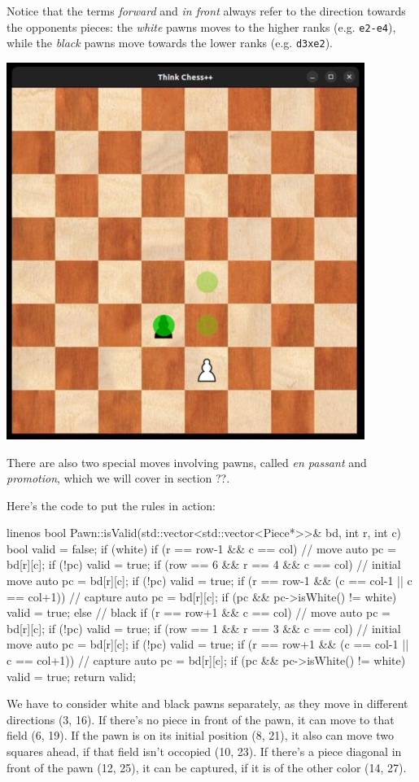Notice that the terms \emph{forward} and \emph{in front} always refer to the direction towards
the opponents pieces: the \emph{white} pawns moves to the higher ranks (e.g. \texttt{e2-e4}),
while the \emph{black} pawns move towards the lower ranks (e.g. \texttt{d3xe2}).

\begin{center}
\includegraphics[width=.5\linewidth]{../img/pawn.jpg}
\end{center}

There are also two special moves involving pawns, called \emph{en passant} and \emph{promotion},
which we will cover in section ??.

Here's the code to put the rules in action:

\begin{cpp*}{linenos}
bool Pawn::isValid(std::vector<std::vector<Piece*>>& bd, int r, int c) {
  bool valid = false;
  if (white) {
    if (r == row-1 && c == col) { // move
      auto pc = bd[r][c];
      if (!pc) valid = true;
    }
    if (row == 6 && r == 4 && c == col) { // initial move
      auto pc = bd[r][c];
      if (!pc) valid = true;
    }
    if (r == row-1 && (c == col-1 || c == col+1)) { // capture
      auto pc = bd[r][c];
      if (pc && pc->isWhite() != white) valid = true;
    }
  } else { // black
    if (r == row+1 && c == col) { // move
      auto pc = bd[r][c];
      if (!pc) valid = true;
    }
    if (row == 1 && r == 3 && c == col) { // initial move
      auto pc = bd[r][c];
      if (!pc) valid = true;
    }
    if (r == row+1 && (c == col-1 || c == col+1)) { // capture
      auto pc = bd[r][c];
      if (pc && pc->isWhite() != white) valid = true;
    }
  }
  return valid;
}
\end{cpp*}

We have to consider white and black pawns separately, as they move in different directions (3, 16).
If there's no piece in front of the pawn, it can move to that field (6, 19).
If the pawn is on its initial position (8, 21), it also can move two squares ahead, if that field
isn't occopied (10, 23).
If there's a piece diagonal in front of the pawn (12, 25), it can be captured, if it is of the
other color (14, 27).
